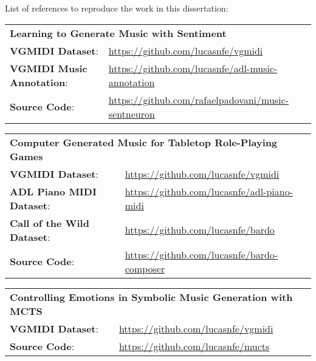 \noindent
List of references to reproduce the work in this dissertation:

\begin{table}[!h]
    \begin{tabular}{ll}
    \multicolumn{2}{l}{\textbf{Learning to Generate Music with Sentiment}} \\
    \textbf{VGMIDI Dataset}:          & \url{https://github.com/lucasnfe/vgmidi} \\
    \textbf{VGMIDI Music Annotation}: & \url{https://github.com/lucasnfe/adl-music-annotation} \\
    \textbf{Source Code}:             & \url{https://github.com/rafaelpadovani/music-sentneuron} \\
    \end{tabular}
\end{table}

\begin{table}[!h]
    \begin{tabular}{ll}
    \multicolumn{2}{l}{\textbf{Computer Generated Music for Tabletop Role-Playing Games}} \\
    \textbf{VGMIDI Dataset}: & \url{https://github.com/lucasnfe/vgmidi} \\
    \textbf{ADL Piano MIDI Dataset}: & \url{https://github.com/lucasnfe/adl-piano-midi} \\
    \textbf{Call of the Wild Dataset}: & \url{https://github.com/lucasnfe/bardo} \\
    \textbf{Source Code}: & \url{https://github.com/lucasnfe/bardo-composer} \\
    \end{tabular}
\end{table}

\begin{table}[!h]
    \begin{tabular}{ll}
    \multicolumn{2}{l}{\textbf{Controlling Emotions in Symbolic Music Generation with MCTS}} \\
    \textbf{VGMIDI Dataset}: & \url{https://github.com/lucasnfe/vgmidi} \\
    \textbf{Source Code}: & \url{https://github.com/lucasnfe/mucts} \\
    \end{tabular}
\end{table}

